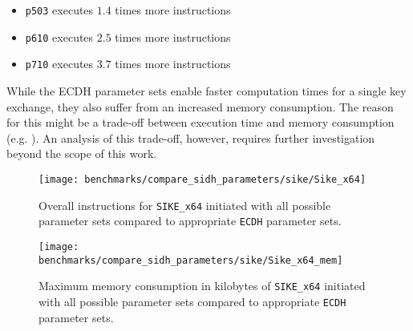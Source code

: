 \begin{itemize}
\itemsep0em 
\item \texttt{p503} executes $1.4$ times more instructions
\item \texttt{p610} executes $2.5$ times more instructions
\item \texttt{p710} executes $3.7$ times more instructions
\end{itemize}
While the \gls{ECDH} parameter sets enable faster computation times for a single key exchange, they also suffer from an increased memory consumption. The reason for this might be a trade-off between execution time and memory consumption (e.g. \parencite{1056220}). An analysis of this trade-off, however, requires further investigation beyond the scope of this work.
\begin{figure}[H]
  \centering
  \texttt{[image: benchmarks/compare\_sidh\_parameters/sike/Sike\_x64]}
  \caption[Overall instructions for all parameter sets via \texttt{SIKE\_x64} compared to \texttt{ECDH}]
  {Overall instructions for \texttt{SIKE\_x64} initiated with all possible parameter sets compared to appropriate \texttt{ECDH} parameter sets.}
  \label{fig:results_all_curves_sike}
\end{figure}

\begin{figure}[H]
  \centering
  \texttt{[image: benchmarks/compare\_sidh\_parameters/sike/Sike\_x64\_mem]}
  \caption[Maximum memory consumption for all parameter sets via \texttt{SIKE\_x64}  compared to \texttt{ECDH}]
  {Maximum memory consumption in kilobytes of \texttt{SIKE\_x64} initiated with all possible parameter sets compared to appropriate \texttt{ECDH} parameter sets.}
  \label{fig:results_all_curves_sike_mem}
\end{figure}


